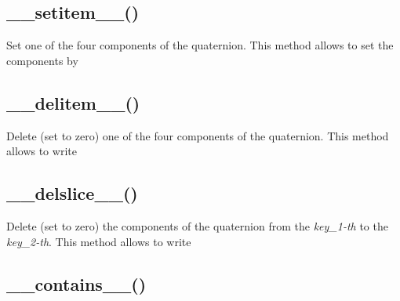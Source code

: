 \documentclass[letterpaper,10pt,english]{sphinxmanual}
\begin{document}
\subsection{\_\_setitem\_\_()}
\label{methods:setitem}

\begin{fulllineitems}
\label{methods:__setitem__}
\end{fulllineitems}


Set one of the four components of the quaternion. This method allows to set the components by



\subsection{\_\_delitem\_\_()}
\label{methods:delitem}

\begin{fulllineitems}
\label{methods:__delitem__}
\end{fulllineitems}


Delete (set to zero) one of the four components of the quaternion. This method allows to write



\subsection{\_\_delslice\_\_()}
\label{methods:delslice}

\begin{fulllineitems}
\label{methods:__delslice__}
\end{fulllineitems}


Delete (set to zero) the components of the quaternion from the \emph{key\_1-th} to the \emph{key\_2-th}. This method allows to write



\subsection{\_\_contains\_\_()}
\label{methods:contains}
\end{document}
